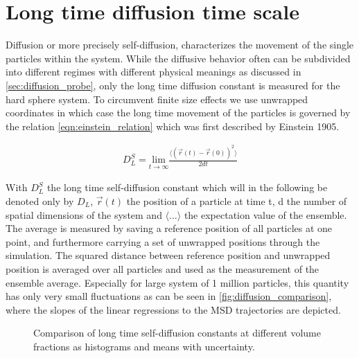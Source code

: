 \section{Long time diffusion time scale}
\label{sec:diffusion_metastable_liquid}
Diffusion or more precisely self-diffusion, characterizes the movement of the single particles within the system. While the diffusive behavior often can be subdivided into different regimes with different physical meanings as discussed in \autoref{sec:diffusion_probe}, only the long time diffusion constant is measured for the hard sphere system. To circumvent finite size effects we use unwrapped coordinates in which case the long time movement of the particles is governed by the relation \autoref{eqn:einstein_relation} which was first described by Einstein 1905\cite{Albert1905}.

\begin{align}
\label{eqn:einstein_relation}
D^S_L = \underset{t\rightarrow \infty}{\text{lim}} \frac{\langle (\vec{r}(t) - \vec{r}(0) )^2 \rangle}{2 d t}
\end{align}

With $D^S_L$ the long time self-diffusion constant which will in the following be denoted only by $D_L$, $\vec{r}(t)$ the position of a particle at time t, d the number of spatial dimensions of the system and $\langle ... \rangle$ the expectation value of the ensemble.\\

The average is measured by saving a reference position of all particles at one point, and furthermore carrying a set of unwrapped positions through the simulation. The squared distance between reference position and unwrapped position is averaged over all particles and used as the measurement of the ensemble average. Especially for large system of 1 million particles, this quantity has only very small fluctuations as can be seen in \autoref{fig:diffusion_comparison}, where the slopes of the linear regressions to the MSD trajectories are depicted.\\

\begin{figure}[h]
 \hspace{0.5cm}
\caption[Long time self-diffusion constant measurements from production data]{Comparison of long time self-diffusion constants at different volume fractions as histograms and means with uncertainty.}
\label{fig:diffusion_comparison}
\end{figure}

